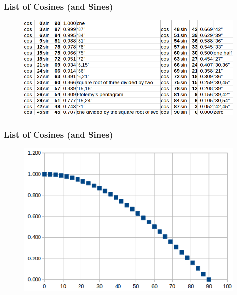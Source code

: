 \documentclass[xcolor=dvipsnames]{beamer}
\begin{document}
\begin{frame}
  \frametitle{List of Cosines (and Sines)}
  \begin{figure}[h]
    \includegraphics[scale=.4]{./SinCos2.png}
  \end{figure}
\end{frame}

\begin{frame}
  \frametitle{List of Cosines (and Sines)}
  \begin{figure}[h]
    \includegraphics[scale=.6]{./SinCos1.png}
  \end{figure}
\end{frame}
\end{document}
